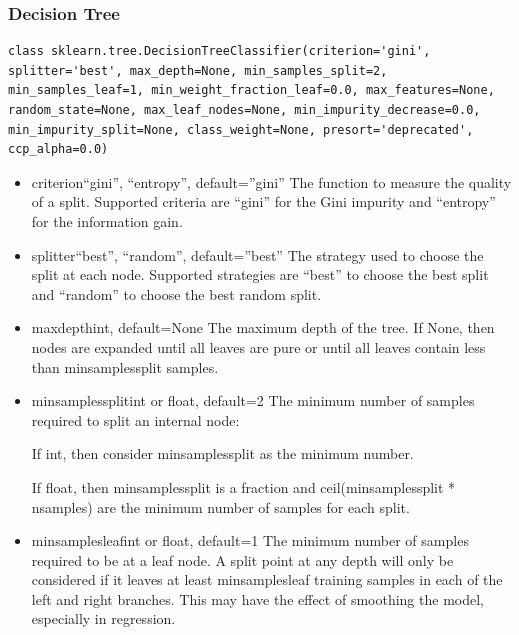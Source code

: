 \documentclass[12pt]{article}
\begin{document}
\subsubsection{Decision Tree}
\begin{lstlisting}
class sklearn.tree.DecisionTreeClassifier(criterion='gini', splitter='best', max_depth=None, min_samples_split=2, min_samples_leaf=1, min_weight_fraction_leaf=0.0, max_features=None, random_state=None, max_leaf_nodes=None, min_impurity_decrease=0.0, min_impurity_split=None, class_weight=None, presort='deprecated', ccp_alpha=0.0)
\end{lstlisting}

\begin{itemize}

\item
criterion{“gini”, “entropy”}, default=”gini”
The function to measure the quality of a split. Supported criteria are “gini” for the Gini impurity and “entropy” for the information gain.

\item
splitter{“best”, “random”}, default=”best”
The strategy used to choose the split at each node. Supported strategies are “best” to choose the best split and “random” to choose the best random split.

\item
max\textunderscore depthint, default=None
The maximum depth of the tree. If None, then nodes are expanded until all leaves are pure or until all leaves contain less than min\textunderscore samples\textunderscore split samples.


\item
min\textunderscore samples\textunderscore splitint or float, default=2
The minimum number of samples required to split an internal node:

If int, then consider min\textunderscore samples\textunderscore split as the minimum number.

If float, then min\textunderscore samples\textunderscore split is a fraction and ceil(min\textunderscore samples\textunderscore split * n\textunderscore samples) are the minimum number of samples for each split.

\item
min\textunderscore samples\textunderscore leafint or float, default=1
The minimum number of samples required to be at a leaf node. A split point at any depth will only be considered if it leaves at least min\textunderscore samples\textunderscore leaf training samples in each of the left and right branches. This may have the effect of smoothing the model, especially in regression.


\end{itemize}
\end{document}
